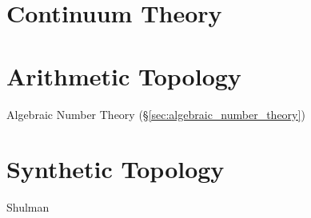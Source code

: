 \section{Continuum Theory}\label{sec:continuum_theory}

\section{Arithmetic Topology}\label{sec:arithmetic_topology}

Algebraic Number Theory (\S\ref{sec:algebraic_number_theory})



\section{Synthetic Topology}\label{sec:synthetic_topology}

\fist Shulman
